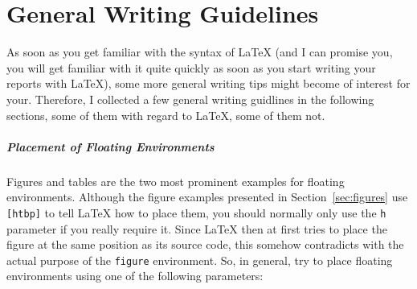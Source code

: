 
\chapter{General Writing Guidelines}

As soon as you get familiar with the syntax of \LaTeX{} (and I can
promise you, you will get familiar with it quite quickly as soon as
you start writing your reports with \LaTeX{}), some more general
writing tips might become of interest for your. Therefore, I collected
a few general writing guidlines in the following sections, some of
them with regard to \LaTeX{}, some of them not.

\paragraph{Placement of Floating Environments}
Figures and tables are the two most prominent examples for floating
environments. Although the figure examples presented in
Section~\ref{sec:figures} use \texttt{[htbp]} to tell \LaTeX{} how to
place them, you should normally only use the \texttt{h} parameter if
you really require it. Since \LaTeX{} then at first tries to place the
figure at the same position as its source code, this somehow
contradicts with the actual purpose of the \texttt{figure}
environment. So, in general, try to place floating environments using
one of the following parameters:

